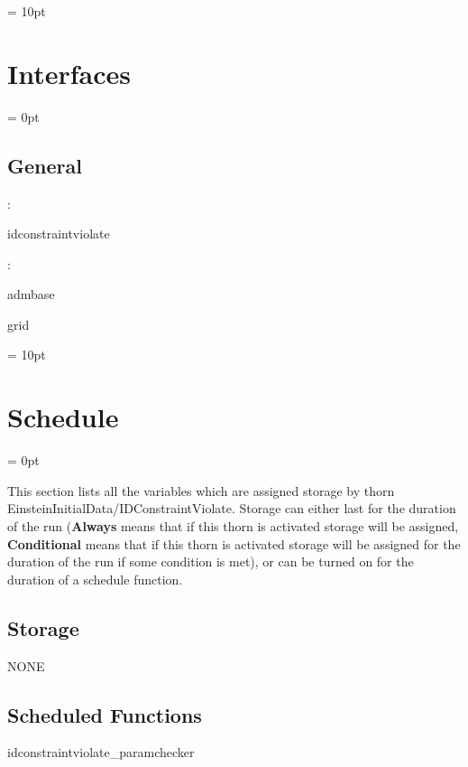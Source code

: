 \documentclass{article}
\begin{document}
\vspace{0.5cm}\parskip = 10pt 

\section{Interfaces} 


\parskip = 0pt

\vspace{3mm} \subsection*{General}

: 

idconstraintviolate
\vspace{2mm}

: 

admbase

grid
\vspace{2mm}

\vspace{5mm}\parskip = 10pt 

\section{Schedule} 


\parskip = 0pt


\noindent This section lists all the variables which are assigned storage by thorn EinsteinInitialData/IDConstraintViolate.  Storage can either last for the duration of the run ({\bf Always} means that if this thorn is activated storage will be assigned, {\bf Conditional} means that if this thorn is activated storage will be assigned for the duration of the run if some condition is met), or can be turned on for the duration of a schedule function.


\subsection*{Storage}NONE
\subsection*{Scheduled Functions}
\vspace{5mm}


\hspace{5mm} idconstraintviolate\_paramchecker 
\end{document}

